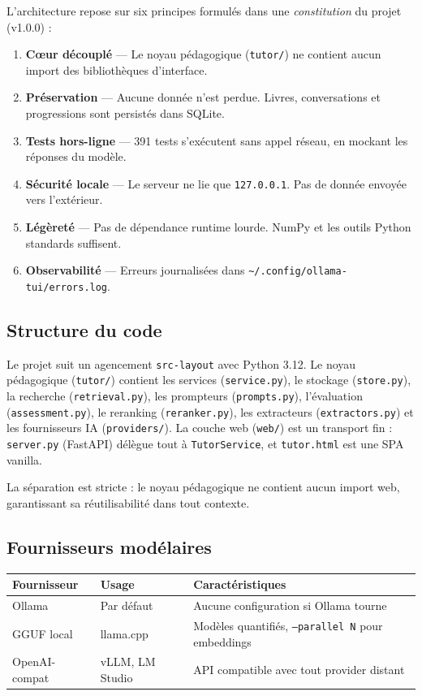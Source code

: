 \documentclass[11pt,a4paper]{article}
\begin{document}
L'architecture repose sur six principes formulés dans une \textit{constitution} du projet (v1.0.0) :

\begin{enumerate}
    \item \textbf{Cœur découplé} --- Le noyau pédagogique (\texttt{tutor/}) ne contient aucun import des bibliothèques d'interface.
    \item \textbf{Préservation} --- Aucune donnée n'est perdue. Livres, conversations et progressions sont persistés dans SQLite.
    \item \textbf{Tests hors-ligne} --- 391 tests s'exécutent sans appel réseau, en mockant les réponses du modèle.
    \item \textbf{Sécurité locale} --- Le serveur ne lie que \texttt{127.0.0.1}. Pas de donnée envoyée vers l'extérieur.
    \item \textbf{Légèreté} --- Pas de dépendance runtime lourde. NumPy et les outils Python standards suffisent.
    \item \textbf{Observabilité} --- Erreurs journalisées dans \texttt{\~{}/.config/ollama-tui/errors.log}.
\end{enumerate}

\subsection{Structure du code}

Le projet suit un agencement \texttt{src-layout} avec Python 3.12. Le noyau pédagogique (\texttt{tutor/}) contient les services (\texttt{service.py}), le stockage (\texttt{store.py}), la recherche (\texttt{retrieval.py}), les prompteurs (\texttt{prompts.py}), l'évaluation (\texttt{assessment.py}), le reranking (\texttt{reranker.py}), les extracteurs (\texttt{extractors.py}) et les fournisseurs IA (\texttt{providers/}). La couche web (\texttt{web/}) est un transport fin : \texttt{server.py} (FastAPI) délègue tout à \texttt{TutorService}, et \texttt{tutor.html} est une SPA vanilla.

La séparation est stricte : le noyau pédagogique ne contient aucun import web, garantissant sa réutilisabilité dans tout contexte.

\subsection{Fournisseurs modélaires}

\begin{center}
\begin{tabularx}{\textwidth}{l l X}
\toprule
\textbf{Fournisseur} & \textbf{Usage} & \textbf{Caractéristiques} \\
\midrule
Ollama & Par défaut & Aucune configuration si Ollama tourne \\
GGUF local & llama.cpp & Modèles quantifiés, \texttt{--parallel N} pour embeddings \\
OpenAI-compat & vLLM, LM Studio & API compatible avec tout provider distant \\
\bottomrule
\end{tabularx}
\end{center}
\end{document}
